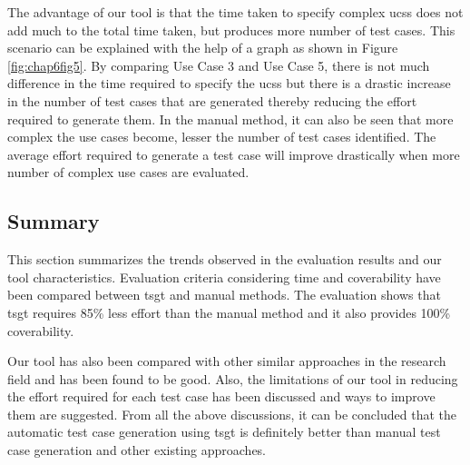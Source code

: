 The advantage of our tool is that the time taken to specify complex \glspl{ucs} does not add much to the total time taken, but produces more number of test cases. This scenario can be explained with the help of a graph as shown in Figure \ref{fig:chap6fig5}. By comparing Use Case 3 and Use Case 5, there is not much difference in the time required to specify the \glspl{ucs} but there is a drastic increase in the number of test cases that are generated thereby reducing the effort required to generate them. In the manual method, it can also be seen that more complex the use cases become, lesser the number of test cases identified. The average effort required to generate a test case will improve drastically when more number of complex use cases are evaluated.

\subsection{Summary}
This section summarizes the trends observed in the evaluation results and our tool characteristics. Evaluation criteria considering time and coverability have been compared between \gls{tsgt} and manual methods. The evaluation shows that \gls{tsgt} requires 85\% less effort than the manual method and it also provides 100\% coverability. 

Our tool has also been compared with other similar approaches in the research field and has been found to be good. Also, the limitations of our tool in reducing the effort required for each test case has been discussed and ways to improve them are suggested. From all the above discussions, it can be concluded that the automatic test case generation using \gls{tsgt} is definitely better than manual test case generation and other existing approaches. 